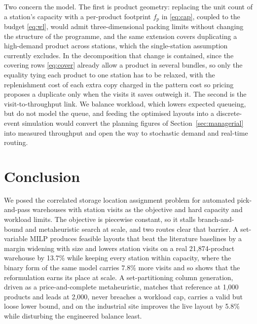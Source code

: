 \documentclass[]{interact}
\begin{document}
Two concern the model. The first is product geometry: replacing the unit count of a station's capacity with a per-product footprint $f_p$ in \eqref{eq:cap}, coupled to the budget \eqref{eq:wl}, would admit three-dimensional packing limits without changing the structure of the programme, and the same extension covers duplicating a high-demand product across stations, which the single-station assumption currently excludes. In the decomposition that change is contained, since the covering rows \eqref{eq:cover} already allow a product in several bundles, so only the equality tying each product to one station has to be relaxed, with the replenishment cost of each extra copy charged in the pattern cost so pricing proposes a duplicate only when the visits it saves outweigh it. The second is the visit-to-throughput link. We balance workload, which lowers expected queueing, but do not model the queue, and feeding the optimised layouts into a discrete-event simulation would convert the planning figures of Section~\ref{sec:managerial} into measured throughput and open the way to stochastic demand and real-time routing.

\section{Conclusion}\label{sec:conclusion}
We posed the correlated storage location assignment problem for automated pick-and-pass warehouses with station visits as the objective and hard capacity and workload limits. The objective is piecewise constant, so it stalls branch-and-bound and metaheuristic search at scale, and two routes clear that barrier. A set-variable MILP produces feasible layouts that beat the literature baselines by a margin widening with size and lowers station visits on a real 21,874-product warehouse by 13.7\% while keeping every station within capacity, where the binary form of the same model carries 7.8\% more visits and so shows that the reformulation earns its place at scale. A set-partitioning column generation, driven as a price-and-complete metaheuristic, matches that reference at 1,000 products and leads at 2,000, never breaches a workload cap, carries a valid but loose lower bound, and on the industrial site improves the live layout by 5.8\% while disturbing the engineered balance least.
\end{document}
